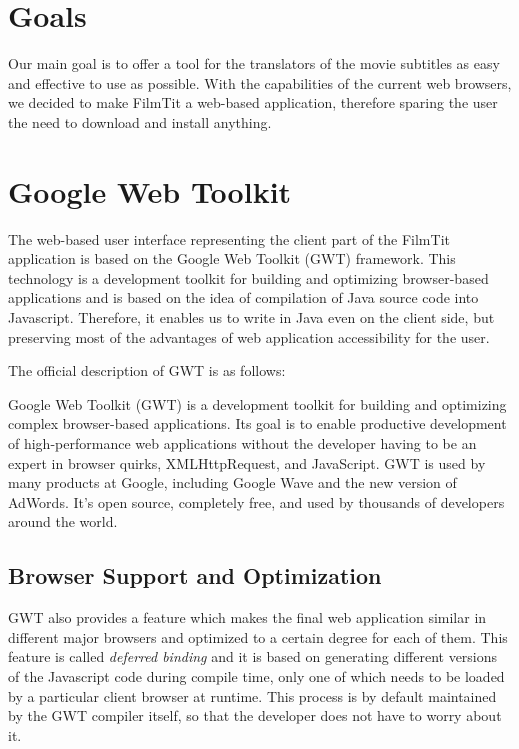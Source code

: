 
\section{Goals}
Our main goal is to offer a tool for the translators of the movie subtitles as easy and effective to use as possible. With the capabilities of the current web browsers, we decided to make FilmTit a web-based application, therefore sparing the user the need to download and install anything.

\section{Google Web Toolkit}
The web-based user interface representing the client part of the FilmTit application is based on the Google Web Toolkit (GWT) framework. This technology is a development toolkit for building and optimizing browser-based applications %
and is based on the idea of compilation of Java source code into Javascript. Therefore, it enables us to write in Java even on the client side, but preserving most of the advantages of web application accessibility for the user.

The official description of GWT is as follows:

Google Web Toolkit (GWT) is a development toolkit for building and optimizing complex browser-based applications. Its goal is to enable productive development of high-performance web applications without the developer having to be an expert in browser quirks, XMLHttpRequest, and JavaScript. GWT is used by many products at Google, including Google Wave and the new version of AdWords. It's open source, completely free, and used by thousands of developers around the world.


\subsection{Browser Support and Optimization}
GWT also provides a feature which makes the final web application similar in different major browsers and optimized to a certain degree for each of them. This feature is called {\em deferred binding} and it is based on generating different versions of the Javascript code during compile time, only one of which needs to be loaded by a particular client browser at runtime. This process is by default maintained by the GWT compiler itself, so that the developer does not have to worry about it.

